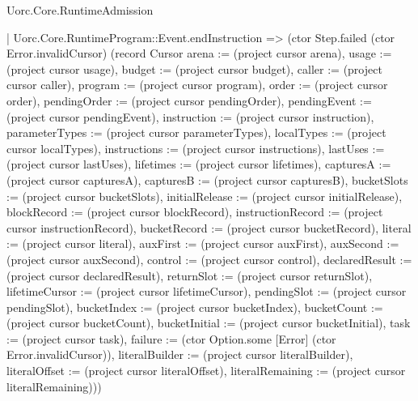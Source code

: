 \begin{lexlean}{Uorc.Core.RuntimeAdmission}
\begin{semanticmodule}
{          | Uorc.Core.RuntimeProgram::Event.endInstruction => (ctor Step.failed (ctor Error.invalidCursor) (record Cursor {arena := (project cursor arena), usage := (project cursor usage), budget := (project cursor budget), caller := (project cursor caller), program := (project cursor program), order := (project cursor order), pendingOrder := (project cursor pendingOrder), pendingEvent := (project cursor pendingEvent), instruction := (project cursor instruction), parameterTypes := (project cursor parameterTypes), localTypes := (project cursor localTypes), instructions := (project cursor instructions), lastUses := (project cursor lastUses), lifetimes := (project cursor lifetimes), capturesA := (project cursor capturesA), capturesB := (project cursor capturesB), bucketSlots := (project cursor bucketSlots), initialRelease := (project cursor initialRelease), blockRecord := (project cursor blockRecord), instructionRecord := (project cursor instructionRecord), bucketRecord := (project cursor bucketRecord), literal := (project cursor literal), auxFirst := (project cursor auxFirst), auxSecond := (project cursor auxSecond), control := (project cursor control), declaredResult := (project cursor declaredResult), returnSlot := (project cursor returnSlot), lifetimeCursor := (project cursor lifetimeCursor), pendingSlot := (project cursor pendingSlot), bucketIndex := (project cursor bucketIndex), bucketCount := (project cursor bucketCount), bucketInitial := (project cursor bucketInitial), task := (project cursor task), failure := (ctor Option.some [Error] (ctor Error.invalidCursor)), literalBuilder := (project cursor literalBuilder), literalOffset := (project cursor literalOffset), literalRemaining := (project cursor literalRemaining)}))
}
\end{semanticmodule}
\end{lexlean}
